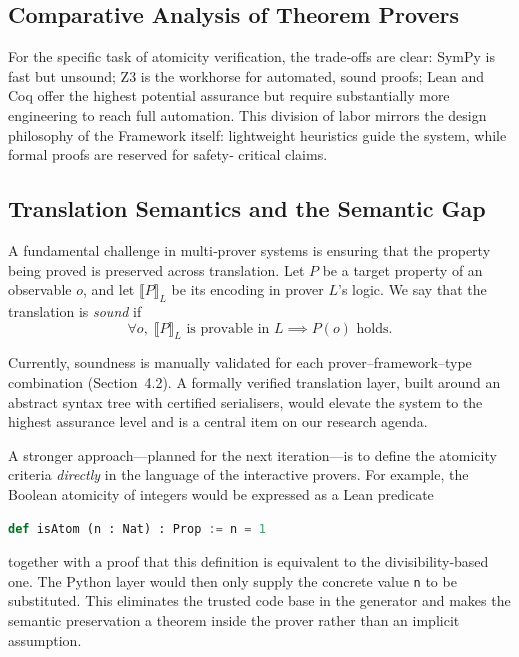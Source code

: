 \subsection{Comparative Analysis of Theorem Provers}



For the specific task of atomicity verification, the trade‑offs are clear:
SymPy is fast but unsound; Z3 is the workhorse for automated, sound proofs;
Lean and Coq offer the highest potential assurance but require substantially
more engineering to reach full automation.  This division of labor mirrors
the design philosophy of the \Apeiron{} Framework itself: lightweight
heuristics guide the system, while formal proofs are reserved for safety‑
critical claims.

\subsection{Translation Semantics and the Semantic Gap}

A fundamental challenge in multi‑prover systems is ensuring that the
property being proved is preserved across translation.  Let $P$ be a
target property of an observable $o$, and let $\llbracket P \rrbracket_L$
be its encoding in prover $L$'s logic.  We say that the translation is
\emph{sound} if
\[
\forall o,\; \llbracket P \rrbracket_L \text{ is provable in } L
\implies P(o) \text{ holds}.
\]

Currently, soundness is manually validated for each prover–framework–type
combination (Section~4.2).  A formally verified translation layer, built
around an abstract syntax tree with certified serialisers, would elevate
the system to the highest assurance level and is a central item on our
research agenda.

A stronger approach—planned for the next iteration—is to define the
atomicity criteria \emph{directly} in the language of the interactive
provers.  For example, the Boolean atomicity of integers would be
expressed as a Lean predicate
\begin{lstlisting}[language=Python]
def isAtom (n : Nat) : Prop := n = 1
\end{lstlisting}
together with a proof that this definition is equivalent to the
divisibility‑based one.  The Python layer would then only supply the
concrete value \texttt{n} to be substituted.  This eliminates the
trusted code base in the generator and makes the semantic preservation
a theorem inside the prover rather than an implicit assumption.

